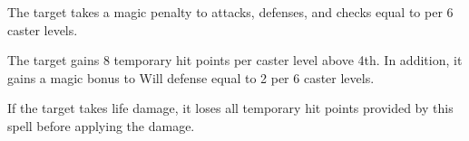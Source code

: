 \begin{spellheader}
\end{spellheader}
\begin{spellcontent}
    \begin{spelltargetinginfo}
    \end{spelltargetinginfo}
    \begin{spelleffects}
        \spelleffect The target takes a magic penalty to attacks, defenses, and checks equal to   per 6 caster levels.
        \spelldur{\durshort}
    \end{spelleffects}
\end{spellcontent}
\begin{spellfooter}
\end{spellfooter}

\begin{spellheader}
\end{spellheader}
\begin{spellcontent}
    \begin{spelltargetinginfo}
    \end{spelltargetinginfo}
    \begin{spelleffects}
        \spelleffect The target gains 8 temporary hit points  per caster level above 4th. In addition, it gains a magic bonus to Will defense equal to 2  per 6 caster levels.
        \spelldur{\durshort}
    \end{spelleffects}
\end{spellcontent}
\begin{spellfooter}
    \spellnotes If the target takes life damage, it loses all temporary hit points provided by this spell before applying the damage.
\end{spellfooter}

